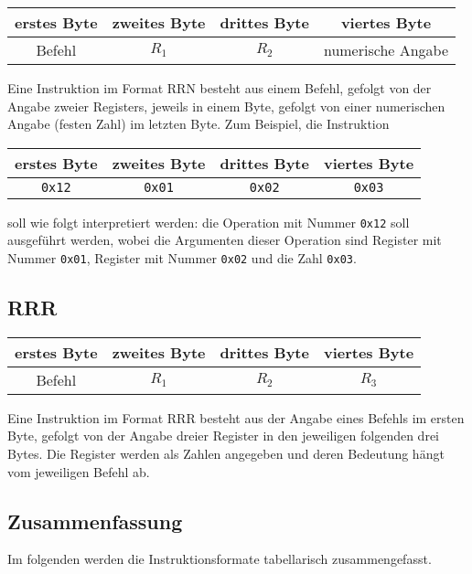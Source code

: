 \begin{center}
  \begin{tabular}{|*{4}{c|}} \hline
    erstes Byte  & zweites Byte  & drittes Byte  & viertes Byte \\\hline\hline
    Befehl       & $R_{1}$       & $R_{2}$ & numerische Angabe  \\\hline
  \end{tabular}
\end{center}
Eine Instruktion im Format RRN besteht aus einem Befehl, gefolgt von der
Angabe zweier Registers, jeweils in einem Byte, gefolgt von einer numerischen
Angabe (festen Zahl) im letzten Byte. Zum Beispiel, die Instruktion
\begin{center}
  \begin{tabular}{|*{4}{c|}} \hline
    erstes Byte & zweites Byte  & drittes Byte  & viertes Byte \\\hline\hline
    \texttt{0x12} & \texttt{0x01} & \texttt{0x02} & \texttt{0x03} \\\hline
  \end{tabular}
\end{center}
soll wie folgt interpretiert werden: 
die Operation mit Nummer \texttt{0x12} soll ausgeführt werden, wobei die
Argumenten dieser Operation sind Register mit Nummer \texttt{0x01}, Register mit
Nummer \texttt{0x02} und die Zahl \texttt{0x03}.



\subsection{RRR}
\label{subsec:RRR}

\begin{center}
  \begin{tabular}{|*{4}{c|}} \hline
    erstes Byte & zweites Byte  & drittes Byte  & viertes Byte \\\hline\hline
    Befehl      & $R_{1}$       & $R_{2}$       & $R_{3}$      \\\hline
  \end{tabular}
\end{center}

Eine Instruktion im Format RRR besteht aus der Angabe eines Befehls im ersten
Byte, gefolgt von der Angabe dreier Register in den jeweiligen folgenden drei
Bytes. Die Register werden als Zahlen angegeben und deren Bedeutung hängt vom
jeweiligen Befehl ab.


\subsection{Zusammenfassung}
Im folgenden werden die Instruktionsformate tabellarisch zusammengefasst.

